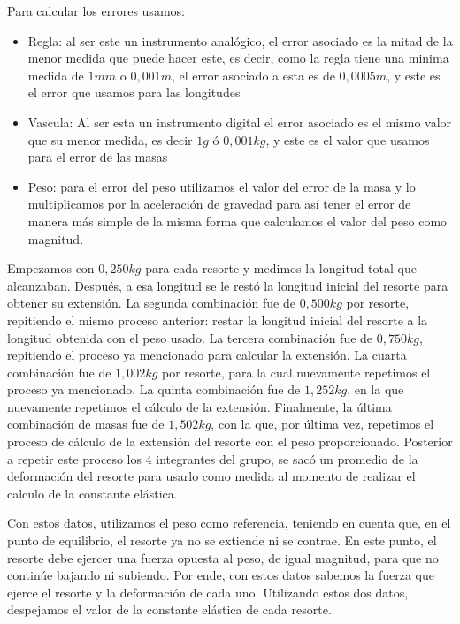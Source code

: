 \documentclass[12pt,a4paper]{article}
\begin{document}
Para calcular los errores usamos:
\begin{itemize}
    \item Regla: al ser este un instrumento analógico, el error asociado es la mitad de la menor medida que puede hacer este, es decir, como la regla tiene una minima medida de $1 mm$ o $0,001 m$, el error asociado a esta es de $0,0005 m$, y este es el error que usamos para las longitudes 
    \item Vascula: Al ser esta un instrumento digital el error asociado es el mismo valor que su menor medida, es decir $1g$ ó $0,001 kg$, y este es el valor que usamos para el error de las masas
    \item Peso: para el error del peso utilizamos el valor del error de la masa y lo multiplicamos por la aceleración de gravedad para así tener el error de manera más simple de la misma forma que calculamos el valor del peso como magnitud.
\end{itemize}

Empezamos con $0,250kg$ para cada resorte y medimos la longitud total que alcanzaban. Después, a esa longitud se le restó la longitud inicial del resorte para obtener su extensión. La segunda combinación fue de $0,500kg$ por resorte, repitiendo el mismo proceso anterior: restar la longitud inicial del resorte a la longitud obtenida con el peso usado. La tercera combinación fue de $0,750kg$, repitiendo el proceso ya mencionado para calcular la extensión. La cuarta combinación fue de $1,002kg$ por resorte, para la cual nuevamente repetimos el proceso ya mencionado. La quinta combinación fue de $1,252kg$, en la que nuevamente repetimos el cálculo de la extensión. Finalmente, la última combinación de masas fue de $1,502kg$, con la que, por última vez, repetimos el proceso de cálculo de la extensión del resorte con el peso proporcionado. Posterior a repetir este proceso los 4 integrantes del grupo, se sacó un promedio de la deformación del resorte para usarlo como medida al momento de realizar el calculo de la constante elástica.

Con estos datos, utilizamos el peso como referencia, teniendo en cuenta que, en el punto de equilibrio, el resorte ya no se extiende ni se contrae. En este punto, el resorte debe ejercer una fuerza opuesta al peso, de igual magnitud, para que no continúe bajando ni subiendo. Por ende, con estos datos sabemos la fuerza que ejerce el resorte y la deformación de cada uno. Utilizando estos dos datos, despejamos el valor de la constante elástica de cada resorte.
\end{document}
